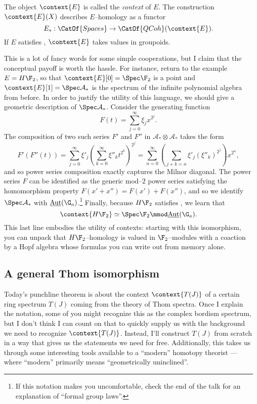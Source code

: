 \begin{definition}
The object $\context{E}$ is called the \textit{context} of $E$.  The construction $\context{E}(X)$ describes $E$--homology as a functor \[E_*: \CatOf{Spaces} \to \CatOf{QCoh}(\context{E}).\]  If $E$ satisfies \FH, $\context{E}$ takes values in groupoids.
\end{definition}

This is a lot of fancy words for some simple cooperations, but I claim that the conceptual payoff is worth the hassle.  For instance, return to the example $E = H\F_2$, so that $\context{E}[0] = \Spec \F_2$ is a point and $\context{E}[1] = \Spec \mathcal A_*$ is the spectrum of the infinite polynomial algebra from before.  In order to justify the utility of this language, we should give a geometric description of $\Spec \mathcal A_*$.  Consider the generating function \[F(t) = \sum_{j=0}^\infty \xi_j x^{2^j}.\]  The composition of two such series $F'$ and $F''$ in $\mathcal A_* \otimes \mathcal A_*$ takes the form \[F'(F''(t)) = \sum_{j=0}^\infty \xi'_j \left(\sum_{k=0}^\infty \xi''_k t^{2^k} \right)^{2^j} = \sum_{n=0}^\infty \left( \sum_{j+k=n} \xi'_j (\xi''_k)^{2^j} \right) x^{2^n},\] and so power series composition exactly captures the Milnor diagonal.  The power series $F$ can be identified as the generic mod--$2$ power series satisfying the homomorphism property $F(x' + x'') = F(x') + F(x'')$, and so we identify $\Spec \mathcal A_*$ with $\underline{\operatorname{Aut}}(\G_a)$.\footnote{If this notation makes you uncomfortable, check the end of the talk for an explanation of ``formal group laws''.}  Finally, because $H\F_2$ satisfies \FH, we learn that \[\context{H\F_2} \simeq \Spec \F_2 \mmod \underline{\operatorname{Aut}}(\G_a).\]  This last line embodies the utility of contexts: starting with this isomorphism, you can unpack that $H\F_2$--homology is valued in $\F_2$--modules with a coaction by a Hopf algebra whose formulas you can write out from memory alone.




\subsection*{A general Thom isomorphism}

Today's punchline theorem is about the context $\context{T(J)}$ of a certain ring spectrum $T(J)$ coming from the theory of Thom spectra.  Once I explain the notation, some of you might recognize this as the complex bordism spectrum, but I don't think I can count on that to quickly supply us with the background we need to recognize $\context{T(J)}$.  Instead, I'll construct $T(J)$ from scratch in a way that gives us the statements we need for free.  Additionally, this takes us through some interesting tools available to a ``modern'' homotopy theorist --- where ``modern'' primarily means ``geometrically uninclined''.

